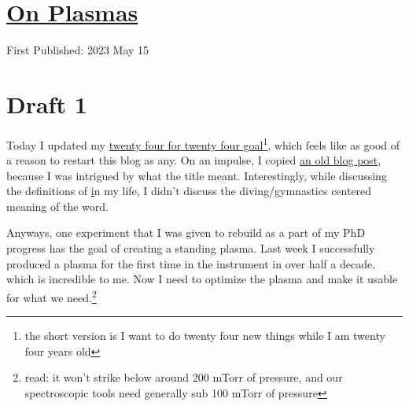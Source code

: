 \documentclass[12pt]{article}[titlepage]
\newcommand{\1}{\={a}}
\newcommand{\2}{\={e}}
\newcommand{\3}{\={\i}}
\newcommand{\4}{\=o}
\newcommand{\5}{\=u}
\newcommand{\6}{\={A}}
\renewcommand{\,}{\textsuperscript{,}}
\begin{document}
\doublespacing
\section{\href{plasma.html}{On Plasmas}}
First Published: 2023 May 15
\section{Draft 1}
Today I updated my \href{twenty-four.html}{twenty four for twenty four goal}\footnote{the short version is I want to do twenty four new things while I am twenty four years old}, which feels like as good of a reason to restart this blog as any.
On an impulse, I copied \href{rolls.html}{an old blog post}, because I was intrigued by what the title meant.
Interestingly, while discussing the definitions of \href{roll} in my life, I didn't discuss the diving/gymnastics centered meaning of the word.

Anyways, one experiment that I was given to rebuild as a part of my PhD progress has the goal of creating a standing plasma.
Last week I successfully produced a plasma for the first time in the instrument in over half a decade, which is incredible to me.
Now I need to optimize the plasma and make it usable for what we need.\footnote{read: it won't strike below around 200 mTorr of pressure, and our spectroscopic tools need generally sub 100 mTorr of pressure}
\end{document}
